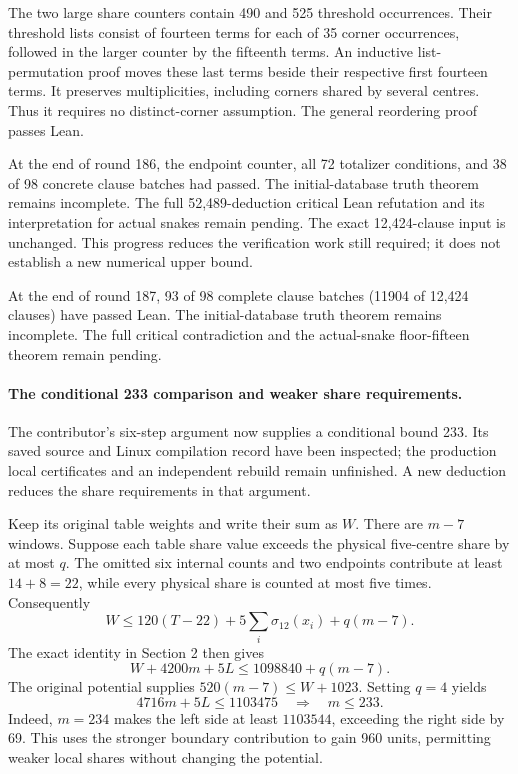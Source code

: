 \documentclass[11pt,a4paper]{article}
\begin{document}
The two large share counters contain 490 and 525 threshold occurrences.
Their threshold lists consist of fourteen terms for each of 35 corner
occurrences, followed in the larger counter by the fifteenth terms.
An inductive list-permutation proof moves these last terms beside their
respective first fourteen terms. It preserves multiplicities, including
corners shared by several centres. Thus it requires no distinct-corner
assumption. The general reordering proof passes Lean.

At the end of round 186, the endpoint counter, all 72 totalizer conditions, and 38 of 98 concrete clause batches had passed. The initial-database truth theorem remains incomplete.
The full 52,489-deduction critical Lean refutation and its interpretation
for actual snakes remain pending. The exact 12,424-clause input is
unchanged. This progress reduces the verification work still required;
it does not establish a new numerical upper bound.

At the end of round 187, 93 of 98 complete clause batches (11904 of 12,424 clauses) have passed Lean. The initial-database truth theorem remains incomplete. The full critical contradiction and the actual-snake floor-fifteen theorem remain pending.

\paragraph{The conditional 233 comparison and weaker share requirements.}
The contributor's six-step argument now supplies a conditional bound 233.
Its saved source and Linux compilation record have been inspected;
the production local certificates and an independent rebuild remain
unfinished. A new deduction reduces the share requirements in that argument.

Keep its original table weights and write their sum as $W$.
There are $m-7$ windows. Suppose each table share value exceeds the physical
five-centre share by at most $q$. The omitted six internal counts and two
endpoints contribute at least $14+8=22$, while every physical share is
counted at most five times. Consequently
\[
W\le120(T-22)+5\sum_i\sigma_{12}(x_i)+q(m-7).
\]
The exact identity in Section 2 then gives
\[
W+4200m+5L\le1098840+q(m-7).
\]
The original potential supplies $520(m-7)\le W+1023$. Setting $q=4$ yields
\[
\boxed{4716m+5L\le1103475\quad\Longrightarrow\quad m\le233.}
\]
Indeed, $m=234$ makes the left side at least $1103544$, exceeding the
right side by 69. This uses the stronger boundary contribution to gain
960 units, permitting weaker local shares without changing the potential.
\end{document}
